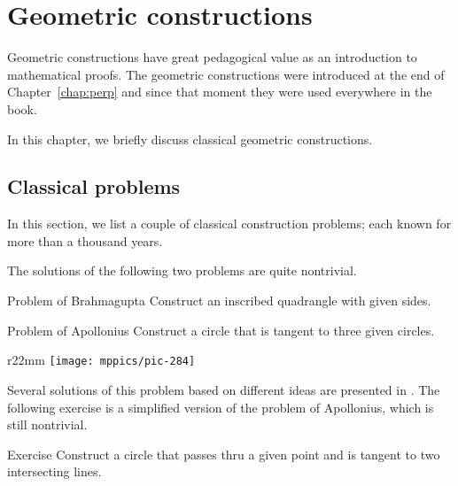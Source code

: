 \chapter{Geometric constructions}
\label{chap:car}


Geometric constructions have great pedagogical value 
as an introduction to mathematical proofs.
The geometric constructions were introduced at the end of Chapter~\ref{chap:perp}
and since that moment they were used everywhere in the book.

In this chapter, we briefly discuss classical geometric constructions.

%
%

\section*{Classical problems}

In this section, we list a couple of classical construction problems;
each known for more than a thousand years. 

The solutions of the following two problems are quite nontrivial.

\begin{thm}{Problem of Brahmagupta} 
Construct an inscribed quadrangle with given sides.
\end{thm}


 
\begin{thm}{Problem of Apollonius} Construct a circle that is tangent to three given circles.
\end{thm}

{

\begin{wrapfigure}{r}{22mm}
\vskip-10mm
\centering
\texttt{[image: mppics/pic-284]}
\end{wrapfigure}

Several solutions of this problem based on different ideas are presented in \cite{hadamard}. 
The following exercise is a simplified version of the problem of Apollonius, which is still nontrivial.

\begin{thm}{Exercise}\label{ex:simple-apollonius}
Construct a circle that passes thru a given point and is tangent to two intersecting lines.
\end{thm}

}


